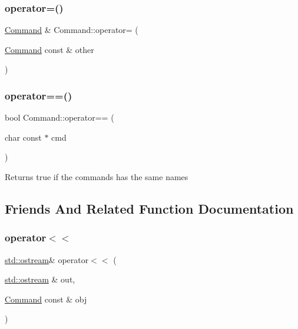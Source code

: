 \subsubsection{\texorpdfstring{operator=()}{operator=()}}
{\footnotesize\ttfamily \hyperlink{classCommand}{Command} \& Command\+::operator= (\begin{DoxyParamCaption}\item[{\hyperlink{classCommand}{Command} const \&}]{other }\end{DoxyParamCaption})}

\mbox{\label{classCommand_a75d6d67687c9d29e47ce9e80540bbd1e}} 
\subsubsection{\texorpdfstring{operator==()}{operator==()}}
{\footnotesize\ttfamily bool Command\+::operator== (\begin{DoxyParamCaption}\item[{char const $\ast$}]{cmd }\end{DoxyParamCaption})}

\begin{DoxyReturn}{Returns}
true if the commands has the same names 
\end{DoxyReturn}


\subsection{Friends And Related Function Documentation}
\mbox{\label{classCommand_a0a193e228644a3735c309d8b2b5b9899}} 
\subsubsection{\texorpdfstring{operator$<$$<$}{operator<<}}
{\footnotesize\ttfamily \hyperlink{doctest_8h_a116af65cb5e924b33ad9d9ecd7a783f3}{std\+::ostream}\& operator$<$$<$ (\begin{DoxyParamCaption}\item[{\hyperlink{doctest_8h_a116af65cb5e924b33ad9d9ecd7a783f3}{std\+::ostream} \&}]{out,  }\item[{\hyperlink{classCommand}{Command} const \&}]{obj }\end{DoxyParamCaption})\hspace{0.3cm}{\ttfamily [friend]}}



